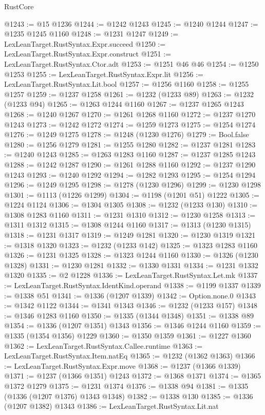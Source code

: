 \begin{lexlean}{RustCore}
\begin{coremodule}
@1243 := @15 @1236
@1244 := @1242 @1243
@1245 := @1240 @1244
@1247 := @1235 @1245 @1160
@1248 := @1231 @1247
@1249 := LexLeanTarget.RustSyntax.Expr.succeed
@1250 := LexLeanTarget.RustSyntax.Expr.construct
@1251 := LexLeanTarget.RustSyntax.Ctor.adt
@1253 := @1251 @46 @46
@1254 := @1250 @1253
@1255 := LexLeanTarget.RustSyntax.Expr.lit
@1256 := LexLeanTarget.RustSyntax.Lit.bool
@1257 := @1256 @1160
@1258 := @1255 @1257
@1259 := @1237 @1258
@1261 := @1232 (@1233 @89)
@1263 := @1232 (@1233 @94)
@1265 := @1263 @1244 @1160
@1267 := @1237 @1265 @1243
@1268 := @1240 @1267
@1270 := @1261 @1268 @1160
@1272 := @1237 @1270 @1243
@1273 := @1242 @1272
@1274 := @1259 @1273
@1275 := @1254 @1274
@1276 := @1249 @1275
@1278 := @1248 (@1230 @1276)
@1279 := Bool.false
@1280 := @1256 @1279
@1281 := @1255 @1280
@1282 := @1237 @1281
@1283 := @1240 @1243
@1285 := @1263 @1283 @1160
@1287 := @1237 @1285 @1243
@1288 := @1242 @1287
@1290 := @1261 @1288 @1160
@1292 := @1237 @1290 @1243
@1293 := @1240 @1292
@1294 := @1282 @1293
@1295 := @1254 @1294
@1296 := @1249 @1295
@1298 := @1278 (@1230 @1296)
@1299 := @1230 @1298
@1301 := @1113 (@1226 @1299)
@1304 := @1198 (@1201 @51) @1222
@1305 := @1224 @1124
@1306 := @1304 @1305
@1308 := @1232 (@1233 @130)
@1310 := @1308 @1283 @1160
@1311 := @1231 @1310
@1312 := @1230 @1258
@1313 := @1311 @1312
@1315 := @1308 @1244 @1160
@1317 := @1313 (@1230 @1315)
@1318 := @1231 @1317
@1319 := @1249 @1281
@1320 := @1230 @1319
@1321 := @1318 @1320
@1323 := @1232 (@1233 @142)
@1325 := @1323 @1283 @1160
@1326 := @1231 @1325
@1328 := @1323 @1244 @1160
@1330 := @1326 (@1230 @1328)
@1331 := @1230 @1281
@1332 := @1330 @1331
@1334 := @1231 @1332 @1320
@1335 := @2 @1228
@1336 := LexLeanTarget.RustSyntax.Let.mk
@1337 := LexLeanTarget.RustSyntax.IdentKind.operand
@1338 := @1199 @1337
@1339 := @1338 @51
@1341 := @1336 (@1207 @1339)
@1342 := Option.none.{0}
@1343 := @1342 @1122
@1344 := @1341 @1343
@1346 := @1232 (@1233 @157)
@1348 := @1346 @1283 @1160
@1350 := @1335 (@1344 @1348)
@1351 := @1338 @89
@1354 := @1336 (@1207 @1351) @1343
@1356 := @1346 @1244 @1160
@1359 := @1335 (@1354 @1356) @1229
@1360 := @1350 @1359
@1361 := @1227 @1360
@1362 := LexLeanTarget.RustSyntax.Callee.runtime
@1363 := LexLeanTarget.RustSyntax.Item.natEq
@1365 := @1232 (@1362 @1363)
@1366 := LexLeanTarget.RustSyntax.Expr.move
@1368 := @1237 (@1366 @1339)
@1371 := @1237 (@1366 @1351) @1243
@1372 := @1368 @1371
@1374 := @1365 @1372 @1279
@1375 := @1231 @1374
@1376 := @1338 @94
@1381 := @1335 (@1336 (@1207 @1376) @1343 @1348)
@1382 := @1338 @130
@1385 := @1336 (@1207 @1382) @1343
@1386 := LexLeanTarget.RustSyntax.Lit.nat

\end{coremodule}
\end{lexlean}

